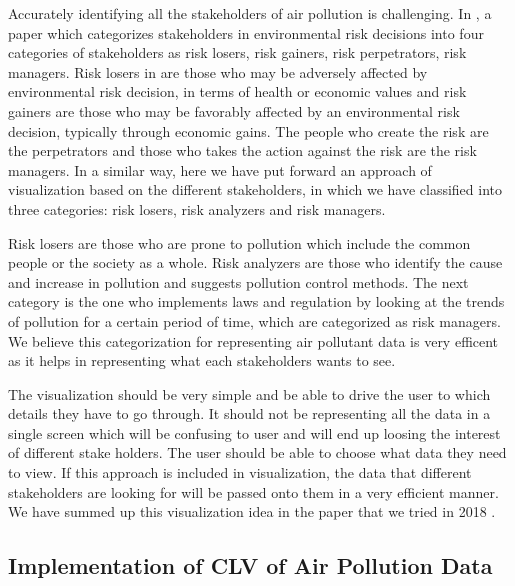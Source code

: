Accurately identifying all the stakeholders of air pollution is challenging. In \cite{English2000}, a paper which categorizes stakeholders in environmental risk decisions into four categories of stakeholders as risk losers, risk gainers, risk perpetrators, risk managers. 
Risk losers in \cite{English2000} are those who may be adversely affected by environmental risk decision, in terms of health or economic values and risk gainers are those who may be favorably affected by an environmental risk decision, typically through economic gains. The people who create the risk are the perpetrators and those who takes the action against the risk are the risk managers. In a similar way, here we have put forward an approach of visualization based on the different stakeholders, in which we have classified into three categories: risk losers, risk analyzers and risk managers. 

Risk losers are those who are prone to pollution which include the common people or the society as a whole. Risk analyzers are those who identify the cause and increase in pollution and suggests pollution control methods. The next category is the one who implements laws and regulation by looking at the trends of pollution for a certain period of time, which are categorized as risk managers. 
We believe this categorization for representing air pollutant data is very efficent as it helps in representing what each stakeholders wants to see.

The visualization should be very simple and be able to drive the user to which details they have to go through. It should not be representing all the data in a single screen which will be confusing to user and will end up loosing the interest of different stake holders. The user should be able to choose what data they need to view. If this approach is included in visualization, the data that different stakeholders are looking for will be passed onto them in a very efficient manner. We have summed up this visualization idea in the paper that we tried in 2018 \cite{Saju2018(1)}.

\subsection{Implementation of CLV of Air Pollution Data}

